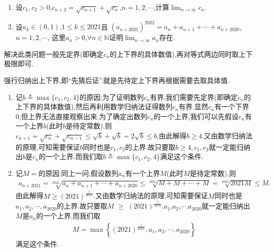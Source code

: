 \documentclass[../../main.tex]{subfiles}
\begin{document}
\begin{example}[类递增模型]\label{example:类递增模型}
\begin{enumerate}
\item 设\(c_1,c_2 > 0\),\(c_{n + 2} = \sqrt{c_{n + 1}} + \sqrt{c_{n}}\),\(n = 1,2,\cdots\),计算\(\lim_{n \to \infty} c_{n}\).

\item 设\(a_k \in (0,1)\),\(1 \leqslant  k \leqslant  2021\)且
\((a_{n + 2021})^{2022} = a_{n} + a_{n + 1} + \cdots + a_{n + 2020}\),\(n = 1,2,\cdots\),
这里\(a_{n} > 0\),\(\forall n \in \mathbb{N}\)证明\(\lim_{n \to \infty} a_{n}\)存在.
\end{enumerate}
\end{example}
\begin{note}
解决此类问题一般先定界(即确定$c_n$的上下界的具体数值),再对等式两边同时取上下极限即可.
\end{note}
\begin{remark}
强行归纳出上下界,即“先猜后证”.就是先待定上下界再根据需要去取具体值.
\begin{enumerate}
\item \label{example3.23-1}记\(b\triangleq\max\{c_1,c_2,4\}\)的原因:为了证明数列${c_n}$有界,我们需要先定界(即确定$c_n$的上下界的具体数值),然后再利用数学归纳法证得数列${c_n}$有界.显然${c_n}$有一个下界0,但上界无法直接观察出来.为了确定出数列${c_n}$的一个上界,我们可以先假设${c_n}$有一个上界$b$(此时$b$是待定常数).则$c_{n+1}=\sqrt{c_n}+\sqrt{c_{n - 1}}\leqslant\sqrt{b}+\sqrt{b}=2\sqrt{b}\leqslant b$,由此解得$b\geqslant  4$.又由数学归纳法的原理,可知需要保证$b$同时也是$c_1,c_2$的上界.故只要取$b\geqslant  4,c_1,c_2$就一定能归纳出$b$是${c_n}$的一个上界.而我们取$b\triangleq\max\{c_1,c_2,4\}$满足这个条件.

\item \label{example3.23-2}记$M=$的原因:同上一问,假设数列${a_n}$有一个上界$M$(此时$M$是待定常数),则
\begin{align*}
a_{n+2021}=\sqrt[2022]{a_n+a_{n+1}+\cdots +a_{n+2020}}\le \sqrt[2022]{M+M+\cdots +M}=\sqrt[2022]{2021M}\le M.
\end{align*}
由此解得$M\geqslant  (2021)^{\frac{1}{2021}}$.又由数学归纳法的原理,可知需要保证$M$同时也是$a_1,a_2,\cdots,a_{2020}$的上界.故只要取$M$ $\geqslant$  $\left(2021\right)^{\frac{1}{2021}}$,$a_1$,$a_2$,$\cdots$,$a_{2020}$就一定能归纳出$M$是${a_n}$的一个上界.而我们取
\begin{align*}
M=\max \left\{ \left( 2021 \right) ^{\frac{1}{2021}},a_1,a_2,\cdots ,a_{2020} \right\} 
\end{align*}
满足这个条件.
\end{enumerate}
\end{remark}
\end{document}
